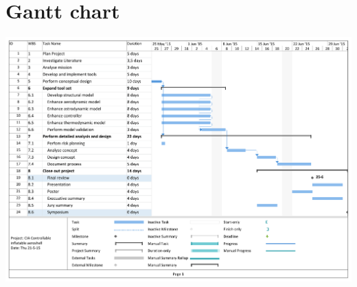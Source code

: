 \section{Gantt chart} \label{app:gantt}

\label{fig:GanttChart}
\includegraphics[angle=90,origin=c,width=0.9\linewidth]{Figure/GanttChartV3.pdf}
